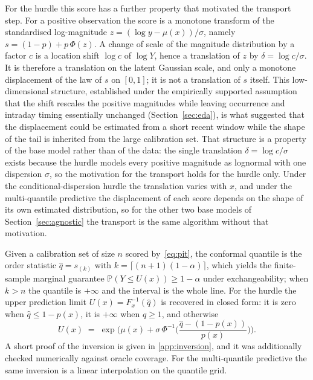 \documentclass[preprint,3p,times]{elsarticle}
\begin{document}
For the hurdle this score has a further property that motivated the transport step. For a positive observation the score is a monotone transform of the standardised log-magnitude $z=(\log y-\mu(x))/\sigma$, namely $s=(1-p)+p\,\Phi(z)$. A change of scale of the magnitude distribution by a factor $c$ is a location shift $\log c$ of $\log Y$, hence a translation of $z$ by $\delta=\log c/\sigma$. It is therefore a translation on the latent Gaussian scale, and only a monotone displacement of the law of $s$ on $[0,1]$; it is not a translation of $s$ itself. This low-dimensional structure, established under the empirically supported assumption that the shift rescales the positive magnitudes while leaving occurrence and intraday timing essentially unchanged (Section~\ref{sec:eda}), is what suggested that the displacement could be estimated from a short recent window while the shape of the tail is inherited from the large calibration set. That structure is a property of the base model rather than of the data: the single translation $\delta=\log c/\sigma$ exists because the hurdle models every positive magnitude as lognormal with one dispersion $\sigma$, so the motivation for the transport holds for the hurdle only. Under the conditional-dispersion hurdle the translation varies with $x$, and under the multi-quantile predictive the displacement of each score depends on the shape of its own estimated distribution, so for the other two base models of Section~\ref{sec:agnostic} the transport is the same algorithm without that motivation.

Given a calibration set of size $n$ scored by~\eqref{eq:pit}, the conformal quantile is the order statistic $\hat q=s_{(k)}$ with $k=\lceil (n+1)(1-\alpha)\rceil$, which yields the finite-sample marginal guarantee $\mathbb{P}(Y \le U(x)) \ge 1-\alpha$ under exchangeability; when $k>n$ the quantile is $+\infty$ and the interval is the whole line. For the hurdle the upper prediction limit $U(x)=F_x^{-1}(\hat q)$ is recovered in closed form: it is zero when $\hat q\le 1-p(x)$, it is $+\infty$ when $\hat q\ge 1$, and otherwise
\begin{equation}
U(x) \;=\; \exp\!\Big(\mu(x) + \sigma\,\Phi^{-1}\!\big(\textstyle\frac{\hat q-(1-p(x))}{p(x)}\big)\Big).
\label{eq:invert}
\end{equation}
A short proof of the inversion is given in \ref{app:inversion}, and it was additionally checked numerically against oracle coverage. For the multi-quantile predictive the same inversion is a linear interpolation on the quantile grid.
\end{document}
